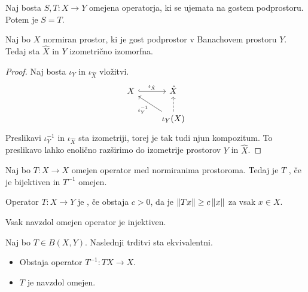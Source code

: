 
\begin{posledica}
  Naj bosta $S, T: X \to Y$ omejena operatorja, ki se ujemata na gostem
  podprostoru.
  Potem je $S = T$.
\end{posledica}

\begin{posledica}
  Naj bo $X$ normiran prostor, ki je gost podprostor v Banachovem prostoru $Y$.
  Tedaj sta $\hat{X}$ in $Y$ izometrično izomorfna.
\end{posledica}

\begin{proof}
  Naj bosta $\iota_Y$ in $\iota_{\hat{X}}$ vložitvi.
  \[\begin{tikzcd}
	  X & {\hat{X}} \\
	  & {\iota_Y(X)}
	  \arrow["{\iota_{\hat{X}}}", hook, from=1-1, to=1-2]
	  \arrow["{\iota_Y^{-1}}", from=2-2, to=1-1]
	  \arrow[dashed, from=2-2, to=1-2]
	\end{tikzcd}\]
  Preslikavi $\iota_Y^{-1}$ in $\iota_{\hat{X}}$ sta izometriji, torej je tak
  tudi njun kompozitum.
  To preslikavo lahko enolično razširimo do izometrije prostorov $Y$ in
  $\hat{X}$.
\end{proof}

\begin{definicija}
  Naj bo $T: X \to X$ omejen operator med normiranima prostoroma.
  Tedaj je $T$ , če je bijektiven in $T^{-1}$ omejen.
\end{definicija}

\begin{definicija}
  Operator $T:X \to Y$ je , če obstaja $c > 0$, da je
  $\left\lVert Tx\right\rVert \ge c \left\lVert x\right\rVert$ za vsak $x \in X$.
\end{definicija}

\begin{opomba}
  Vsak navzdol omejen operator je injektiven.
\end{opomba}

\begin{trditev}
  Naj bo $T \in B(X,Y)$.
  Naslednji trditvi sta ekvivalentni.
  \begin{itemize}
  \item Obstaja operator $T^{-1}: TX \to X$.
  \item $T$ je navzdol omejen.
  \end{itemize}
\end{trditev}

